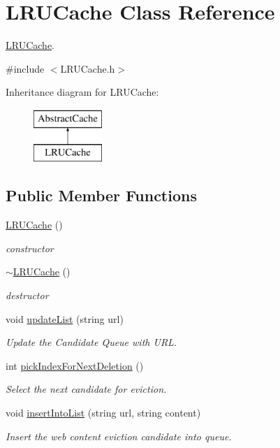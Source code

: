 \hypertarget{classLRUCache}{\section{\-L\-R\-U\-Cache \-Class \-Reference}
\label{classLRUCache}
}


\hyperlink{classLRUCache}{\-L\-R\-U\-Cache}.  




{\ttfamily \#include $<$\-L\-R\-U\-Cache.\-h$>$}

\-Inheritance diagram for \-L\-R\-U\-Cache\-:\begin{figure}[H]
\begin{center}
\leavevmode
\includegraphics[height=2.000000cm]{classLRUCache}
\end{center}
\end{figure}
\subsection*{\-Public \-Member \-Functions}
\begin{DoxyCompactItemize}
\item 
\hyperlink{classLRUCache_a6f624ad11516bc5c8b56ab19250902bb}{\-L\-R\-U\-Cache} ()
\begin{DoxyCompactList}\small\item\em constructor \end{DoxyCompactList}\item 
\hyperlink{classLRUCache_ac841ed5b67e603f2878c26ea7555385f}{$\sim$\-L\-R\-U\-Cache} ()
\begin{DoxyCompactList}\small\item\em destructor \end{DoxyCompactList}\item 
void \hyperlink{classLRUCache_a9ade7fe6ec5353a5b4259ad48929122b}{update\-List} (string url)
\begin{DoxyCompactList}\small\item\em \-Update the \-Candidate \-Queue with \-U\-R\-L. \end{DoxyCompactList}\item 
int \hyperlink{classLRUCache_ab5e4e2db90274ce42e32f0ea466db0ef}{pick\-Index\-For\-Next\-Deletion} ()
\begin{DoxyCompactList}\small\item\em \-Select the next candidate for eviction. \end{DoxyCompactList}\item 
void \hyperlink{classLRUCache_aa767d58be45c61f2e9a1073343465e16}{insert\-Into\-List} (string url, string content)
\begin{DoxyCompactList}\small\item\em \-Insert the web content eviction candidate into queue. \end{DoxyCompactList}\end{DoxyCompactItemize}


